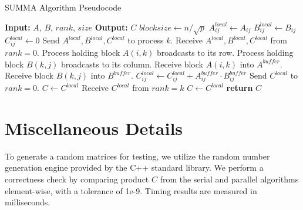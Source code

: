 \documentclass{article}
\begin{document}
\begin{algorithm}
\caption{SUMMA Algorithm Pseudocode}
\begin{algorithmic}[1]
\State \textbf{Input:} $A$, $B$, $rank$, $size$
\State \textbf{Output:} $C$
\State $blocksize \gets n / \sqrt{p}$
                \State $A^{local}_{ij} \gets A_{ij}$
                \State $B^{local}_{ij} \gets B_{ij}$
                \State $C^{local}_{ij} \gets 0$
            \EndFor
        \EndFor
            \State Send $A^{local}, B^{local}, C^{local}$ to process $k$.
        \EndIf
    \EndFor
\EndIf
{}
    \State Receive $A^{local}, B^{local}, C^{local}$ from $rank = 0$.
\EndIf
{}
        \State Process holding block $A(i,k)$ broadcasts to its row.
    \EndFor
        \State Process holding block $B(k, j)$ broadcasts to its column.
    \EndFor
    \State Receive block $A(i,k)$ into $A^{buffer}$.
    \State Receive block $B(k,j)$ into $B^{buffer}$.
            \State $C^{local}_{ij} \gets C^{local}_{ij} + A^{buffer}_{ij} \cdot B^{buffer}_{ij}$
        \EndFor
    \EndFor
\EndFor
{}
    \State Send $C^{local}$ to $rank = 0$.
\EndIf
{}
    \State $C \gets C^{local}$
        \State Receive $C^{local}$ from $rank = k$
        \State $C \gets C^{local}$
    \EndFor
\EndIf
\State \textbf{return} $C$
\end{algorithmic}
\end{algorithm}
\FloatBarrier

\section{Miscellaneous Details}
To generate a random matrices for testing, we utilize the random number generation engine provided by the C++ standard library. We perform a correctness check by comparing product $C$ from the serial and parallel algorithms element-wise, with a tolerance of 1e-9. Timing results are measured in milliseconds.
\end{document}
